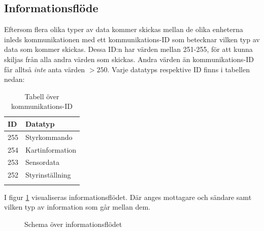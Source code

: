 \documentclass[11pt]{article}
\begin{document}
\begin{flushleft}




\subsection{Informationsflöde}
Eftersom flera olika typer av data kommer skickas mellan de olika enheterna inleds kommunikationen med ett kommunikations-ID som betecknar vilken typ av data som kommer skickas. Dessa ID:n har värden mellan 251-255, för att kunna skiljas från alla andra värden som skickas. Andra värden än kommunikations-ID får alltså \emph{inte} anta värden $>250$. Varje datatyps respektive ID finns i tabellen nedan:

\begin{longtable}[l]{| l | l |} \hline
\textbf{ID} & \textbf{Datatyp} \\ \hline 
255 & Styrkommando \\ \hline
254 & Kartinformation \\ \hline
253 & Sensordata \\ \hline
252 & Styrinställning \\ \hline

\caption{Tabell över kommunikations-ID}\label{kommunikationstab}
\end{longtable}

I figur \ref{informationFlow} visualiseras informationsflödet. Där anges mottagare och sändare samt vilken typ av information som går mellan dem.

\begin{figure}[htbp]
\centering
\noindent\resizebox{.8\linewidth}{!}{
	}
	\caption{Schema över informationsflödet\label{informationFlow}}	
\end{figure}


\end{flushleft}
\end{document}
